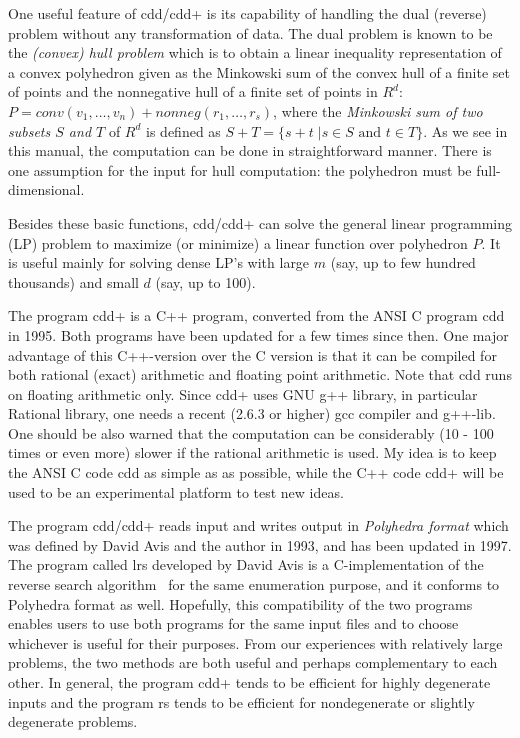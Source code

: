 \documentclass[11pt]{article}
\begin{document}
One useful feature of  cdd/cdd+ is its capability
of handling the dual (reverse)  problem without any transformation
of data.  The dual problem is known to be the 
{\em (convex) hull problem\/} which
is to obtain a linear inequality representation
of a convex polyhedron given as the Minkowski sum of 
the convex hull of a finite set of points and the nonnegative
hull of a finite set of points in $R^d$: 
$P = conv(v_1,\ldots,v_n) +  nonneg(r_1,\ldots,r_s)$, where
 the {\em Minkowski sum of two subsets $S$ and $T$} of $R^d$ is defined
as $S + T = \{ s + t \; |  s \in S \mbox{ and } t \in T \}$.
As we see in this manual, the computation can be done
in straightforward manner.  There is one assumption for the input
for hull computation: the polyhedron must be full-dimensional.

Besides these basic functions, cdd/cdd+ can solve the general
linear programming (LP) problem to maximize (or minimize) a linear
function over polyhedron $P$.   It is useful mainly for solving 
dense LP's with large $m$ (say, up to few hundred thousands) and small $d$ 
(say, up to 100).

The program cdd+ is a C++ program, converted from the ANSI C
program cdd in 1995.  Both programs have been updated for a few times since then.
One major advantage of this C++-version over the C version is
that it can be compiled for both rational (exact) arithmetic and 
floating point arithmetic.  Note that cdd runs on floating
arithmetic only.  Since cdd+ uses GNU g++ library, in particular 
Rational library, one needs a recent (2.6.3 or higher) gcc compiler
and g++-lib.  One should be also warned that the computation
can be considerably  (10 - 100 times or even more) slower if the rational
arithmetic is used.  My idea is to keep the ANSI C code cdd as simple as
as possible, while the C++ code cdd+ will be used to be an experimental
platform to test new ideas.
 

The program cdd/cdd+ reads input and writes output in 
{\em Polyhedra format\/} which was defined by David Avis and
the author in 1993, and has been updated in 1997.  
The program called lrs \cite{a-uglrs-97} developed by David Avis is
a C-implementation of the reverse search algorithm~\cite{af-pachv-92} 
for the same enumeration purpose, and it conforms to Polyhedra format as well.
Hopefully, this compatibility of the two programs
enables users to use both programs for the same input files
and to choose whichever is useful for their purposes.
From our experiences with relatively large problems,
the two methods are both useful and perhaps complementary
to each other.  In general, the program cdd+ tends to be
efficient for highly degenerate inputs and the program rs
tends to be efficient for nondegenerate or slightly
degenerate problems.
\end{document}
